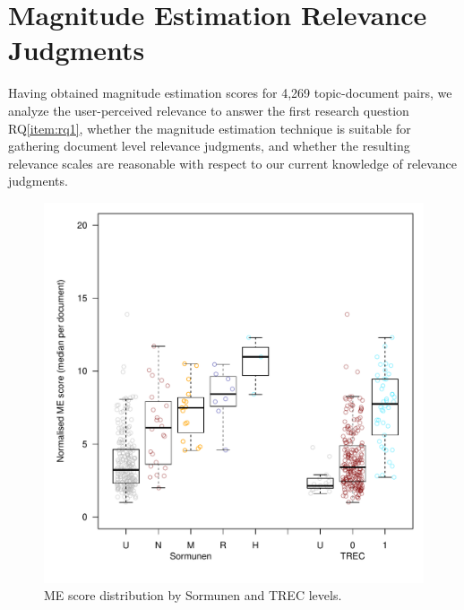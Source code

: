 \section{Magnitude Estimation Relevance Judgments}
\label{sec-rq1}

Having obtained magnitude estimation scores for 4,269 topic-document
pairs, we analyze the user-perceived relevance to answer the first
research question RQ\ref{item:rq1}, whether the magnitude estimation
technique is suitable for gathering document level relevance
judgments, and whether the resulting relevance scales are reasonable
with respect to our current knowledge of relevance judgments.


\begin{figure}[t]
  \centering
  \includegraphics[width=.7\linewidth,page=19]{figs/check_gross_ranks_med.pdf}
  \vspace{-0.5cm}
  \caption{ME score distribution by Sormunen and TREC levels.}
  \label{fig:ME-distribution}
\end{figure}


